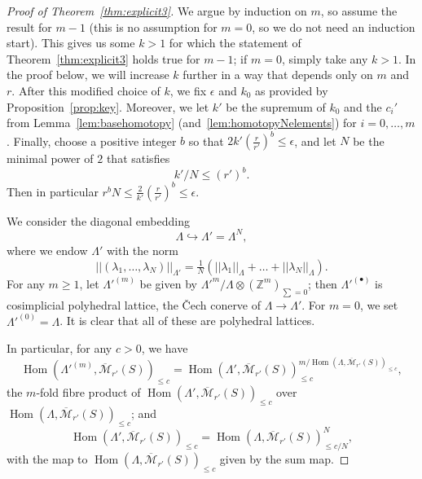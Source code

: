 \documentclass[11pt]{amsbook}
\DeclareMathOperator{\Hom}{Hom}
\numberwithin{equation}{section}
\numberwithin{theorem}{section}
\theoremstyle{definition}
\begin{document}
\begin{proof}[Proof of Theorem~\ref{thm:explicit3}] We argue by induction on $m$, so assume the result for $m-1$ (this is no assumption for $m=0$, so we do not need an induction start). This gives us some $k>1$ for which the statement of Theorem~\ref{thm:explicit3} holds true for $m-1$; if $m=0$, simply take any $k>1$. In the proof below, we will increase $k$ further in a way that depends only on $m$ and $r$. After this modified choice of $k$, we fix $\epsilon$ and $k_0$ as provided by Proposition~\ref{prop:key}. Moreover, we let $k'$ be the supremum of $k_0$ and the $c_i'$ from Lemma~\ref{lem:basehomotopy} (and~\ref{lem:homotopyNelements}) for $i=0,\ldots,m$. Finally, choose a positive integer $b$ so that $2k'(\tfrac r{r'})^b\leq \epsilon$, and let $N$ be the minimal power of $2$ that satisfies
\[
k'/N\leq (r')^b.
\]
Then in particular $r^bN\leq \frac 2{k'}(\tfrac{r}{r'})^b\leq \epsilon$.

We consider the diagonal embedding
\[
\Lambda\hookrightarrow \Lambda' = \Lambda^N,
\]
where we endow $\Lambda'$ with the norm
\[
||(\lambda_1,\ldots,\lambda_N)||_{\Lambda'} = \tfrac 1N(||\lambda_1||_\Lambda+\ldots+||\lambda_N||_\Lambda).
\]
For any $m\geq 1$, let $\Lambda'^{(m)}$ be given by $\Lambda'^m / \Lambda\otimes (\mathbb Z^m)_{\sum=0}$; then $\Lambda'^{(\bullet)}$ is cosimplicial polyhedral lattice, the \v{C}ech conerve of $\Lambda\to \Lambda'$. For $m=0$, we set $\Lambda'^{(0)} = \Lambda$. It is clear that all of these are polyhedral lattices.

In particular, for any $c>0$, we have
\[
\Hom(\Lambda'^{(m)},\overline{\mathcal M}_{r'}(S))_{\leq c} = \Hom(\Lambda',\overline{\mathcal M}_{r'}(S))_{\leq c}^{m/\Hom(\Lambda,\overline{\mathcal M}_{r'}(S))_{\leq c}},
\]
the $m$-fold fibre product of $\Hom(\Lambda',\overline{\mathcal M}_{r'}(S))_{\leq c}$ over $\Hom(\Lambda,\overline{\mathcal M}_{r'}(S))_{\leq c}$; and
\[
\Hom(\Lambda',\overline{\mathcal M}_{r'}(S))_{\leq c} = \Hom(\Lambda,\overline{\mathcal M}_{r'}(S))_{\leq c/N}^N,
\]
with the map to $\Hom(\Lambda,\overline{\mathcal M}_{r'}(S))_{\leq c}$ given by the sum map.


\end{proof}
\end{document}
